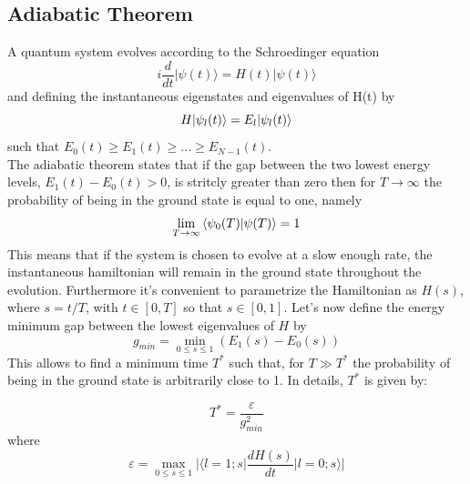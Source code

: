     \subsection{Adiabatic Theorem}\label{subsec:adiabatic theorem}
    A quantum system evolves according to the Schroedinger equation
    \begin{equation}
        i\frac{d}{dt}|\psi(t)\rangle = H(t)|\psi(t)\rangle
    \end{equation}
    and defining the instantaneous eigenstates and eigenvalues of H(t) by
    \begin{equation}
        H{|{\psi_l(t)}\rangle} = E_l{|{\psi_l(t)}\rangle}
    \end{equation}
    such that $E_0(t) \geq E_1(t) \geq ... \geq E_{N-1}(t)$. \\
    The adiabatic theorem states that if the gap between the two lowest energy levels, $E_{1}(t) - E_{0}(t) > 0$, is stritcly greater than zero then for $T\rightarrow \infty$ the probability of being in the ground state is equal to one, namely
    \begin{equation}
        \lim_{T \to \infty} \braket{\psi_0(T)|\psi(T)}= 1
    \end{equation}
    This means that if the system is chosen to evolve at a slow enough rate, the instantaneous hamiltonian will remain in the ground state throughout the evolution. Furthermore it's convenient to parametrize the Hamiltonian as $H(s)$, where $s=t/T$, with $t \in [0,T]$ so that $s \in [0,1]$.
    Let's now define the energy minimum gap between the lowest eigenvalues of $H$ by
    \begin{equation}
        g_{min} = \min_{0 \leq s \leq 1} (E_1(s)-E_0(s))
    \end{equation}
    This allows to find a minimum time $T^*$ such that, for $T\gg T^*$ the probability of being in the ground state is arbitrarily close to 1. In details, $T^*$ is given by:

    \begin{equation}
        T^* = \frac{\varepsilon}{g^{2}_{min}}
        \label{eq:adiabatic_time}
    \end{equation}
    where
    \begin{equation}
        \varepsilon = \max_{0 \leq s \leq 1} \Big| \Big\langle l=1;s\Big| \frac{dH(s)}{dt} \Big| l=0;s\Big\rangle\Big|
    \end{equation}


